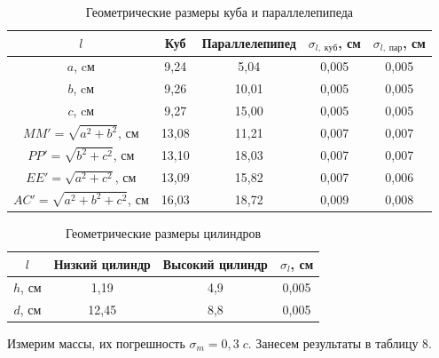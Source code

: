 \documentclass[a4paper, 12pt]{article}
\begin{document}
        \begin{table}[h]
            \centering
            \caption{Геометрические размеры куба и параллелепипеда}
            \begin{tabular}{|c|c|c|c|c|}
                \hline
                $l$ & Куб & Параллелепипед & $\sigma_{l,\;куб}$, см & $\sigma_{l,\;пар}$, см \\
                \hline
                $a$, cм & 9,24 & 5,04 & 0,005 & 0,005 \\
                \hline
                $b$, cм & 9,26 & 10,01 & 0,005 & 0,005 \\
                \hline
                $c$, cм & 9,27 & 15,00 & 0,005 & 0,005 \\
                \hline
                $MM' = \sqrt{a^2+b^2}$, см & 13,08 & 11,21 & 0,007 & 0,007 \\
                \hline
                $PP' = \sqrt{b^2+c^2}$, см & 13,10 & 18,03 & 0,007 & 0,007 \\
                \hline
                $EE' = \sqrt{a^2+c^2}$, см & 13,09 & 15,82 & 0,007 & 0,006 \\
                \hline
                $AC' = \sqrt{a^2+b^2+c^2}$, см & 16,03 & 18,72 & 0,009 & 0,008 \\
                \hline
            \end{tabular}
        \end{table}
        
        \begin{table}[h]
            \centering
            \caption{Геометрические размеры цилиндров}
            \vspace{-3mm}
            \begin{tabular}{|c|c|c|c|}
                \hline
                $l$ & Низкий цилиндр & Высокий цилиндр & $\sigma_l$, см \\
                \hline
                $h$, см & 1,19 & 4,9 & 0,005 \\
                \hline
                $d$, см & 12,45 & 8,8 & 0,005 \\
                \hline
            \end{tabular}
        \end{table}

        Измерим массы, их погрешность $\sigma_m = 0,3\;c$. Занесем результаты в таблицу 8.
        
\end{document}
